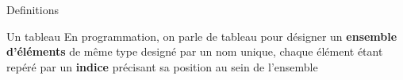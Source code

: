 \begin{frame}{Definitions}
    \begin{block}{Un tableau}
        En programmation,
        on parle de tableau pour d\'esigner un \textbf{ensemble d'\'el\'ements} de m\^eme type design\'e par un nom unique,
        chaque \'el\'ement \'etant rep\'er\'e par un \textbf{indice} pr\'ecisant sa position au sein de l'ensemble
    \end{block}
\end{frame}